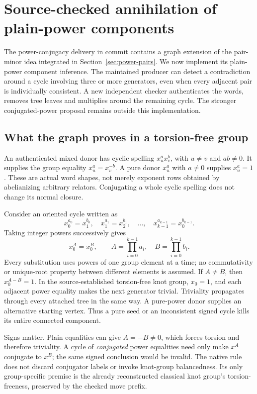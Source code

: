 \section{Source-checked annihilation of plain-power components}
\label{sec:power-components}

The power-conjugacy delivery in commit  contains a graph
extension of the pair-minor idea integrated in Section~\ref{sec:power-pairs}.
We now implement its plain-power component inference. The maintained producer
can detect a contradiction around a cycle involving three or more generators,
even when every adjacent pair is individually consistent. A new independent
checker authenticates the words, removes tree leaves and multiplies around
the remaining cycle. The stronger conjugated-power proposal remains outside
this implementation.

\subsection{What the graph proves in a torsion-free group}

An authenticated mixed donor has cyclic spelling $x_u^a x_v^b$, with
$u\ne v$ and $ab\ne0$. It supplies the group equality $x_u^a=x_v^{-b}$.
A pure donor $x_u^a$ with $a\ne0$ supplies $x_u^a=1$. These are actual word
shapes, not merely exponent rows obtained by abelianizing arbitrary relators.
Conjugating a whole cyclic spelling does not change its normal closure.

Consider an oriented cycle written as
\[
 x_0^{a_0}=x_1^{b_0},\quad x_1^{a_1}=x_2^{b_1},\quad\ldots,\quad
 x_{k-1}^{a_{k-1}}=x_0^{b_{k-1}}.
\]
Taking integer powers successively gives
\[
 x_0^{A}=x_0^{B},\qquad
 A=\prod_{i=0}^{k-1}a_i,\quad B=\prod_{i=0}^{k-1}b_i.
\]
Every substitution uses powers of one group element at a time; no
commutativity or unique-root property between different elements is assumed.
If $A\ne B$, then $x_0^{A-B}=1$. In the source-established torsion-free knot
group, $x_0=1$, and each adjacent power equality makes the next generator
trivial. Triviality propagates through every attached tree in the same way.
A pure-power donor supplies an alternative starting vertex. Thus a pure seed
or an inconsistent signed cycle kills its entire connected component.

Signs matter. Plain equalities can give $A=-B\ne0$, which forces torsion and
therefore triviality. A cycle of \emph{conjugated} power equalities need only
make $x^A$ conjugate to $x^B$; the same signed conclusion would be invalid.
The native rule does not discard conjugator labels or invoke knot-group
balancedness. Its only group-specific premise is the already reconstructed
classical knot group's torsion-freeness, preserved by the checked move prefix.

